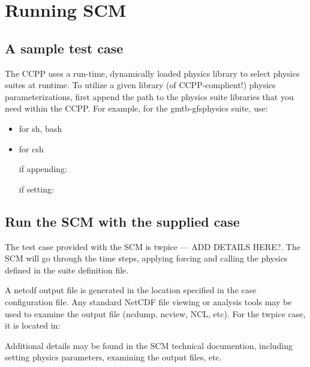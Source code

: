 \chapter{Running SCM}
\label{chapter: runningscm}
\setlength{\parskip}{12pt}
\label{section: runningscm}

\section{A sample test case}

The CCPP uses a run-time, dynamically loaded physics library to select physics suites at runtime.  To utilize a given library (of CCPP-complient!) physics parameterizations, first append the path to the physics suite libraries that you need
within the CCPP. For example, for the gmtb-gfsphysics suite, use:
\begin{itemize}
	\item for sh, bash


	\item for csh

     if appending: 

     if setting: 
\end{itemize}


\section{Run the SCM with the supplied case} 
The test case provided with the SCM is twpice --- ADD DETAILS HERE?. The SCM will go through the time
 steps, applying forcing and calling the physics defined in the suite definition
 file.


A netcdf output file is generated in the location specified in the case
configuration file. Any standard NetCDF file viewing or analysis tools may be used to 
examine the output file (ncdump, ncview, NCL, etc).  For the twpice case, it is located in:


Additional details may be found in the SCM technical documention, including setting physics parameters, examining the output files, etc.  

